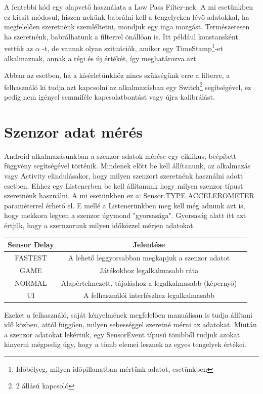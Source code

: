 \documentclass{thesis-ekf}
\theoremstyle{definition}
\theoremstyle{remark}
\begin{document}
\par A fentebbi kód egy alapvető használata a Low Pass Filter-nek. A mi esetünkben ez kicsit módosul, hiszen nekünk babrálni kell a tengelyeken lévő adatokkal, ha megfelelően szeretnénk szemléltetni, mondjuk egy inga mozgást. Természetesen ha szeretnénk, babrálhatunk a filterrel önállóan is. Itt például konstansként vettük az $\alpha$ -t, de vannak olyan szituációk, amikor egy TimeStamp\footnote{Időbélyeg, milyen időpillanatban mértünk adatot, esetünkben}-et alkalmaznak, annak a régi és új értékét, így meghatározva azt.
\par Abban az esetben, ha a kísérletünkhöz nincs szükségünk erre a filterre, a felhasználó ki tudja azt kapcsolni az alkalmazásban egy Switch\footnote{2 állású kapcsoló} segítségével, ez pedig nem igényel semmiféle kapcsolatbontást vagy újra kalibrálást.
\section{Szenzor adat mérés}
Android alkalmazásunkban a szenzor adatok mérése egy ciklikus, beépített függvény segítségével történik. Mindenek előtt be kell állítanunk, az alkalmazás vagy Activity elindulásakor, hogy milyen szenzort szeretnénk használni adott esetben. Ehhez egy Listenerben be kell állítanunk hogy milyen szenzor típust szeretnénk használni. A mi esetünkben ez a: Sensor.TYPE ACCELEROMETER paraméterrel érhető el. E mellé a Listenerünkben meg kell még adnunk azt is, hogy mekkora legyen a szenzor úgymond "gyorsasága". Gyorsaság alatt itt azt értjük, hogy a szernzorunk milyen időközzel mérjen adatokat.
\begin{center}
	\begin{tabular}{ |c|c|c| } 
		\hline
		Sensor Delay & Jelentése\\
		\hline\hline
		FASTEST & A lehető leggyorsabban megkapjuk a szenzor adatot  \\
		\hline
		GAME & Játékokhoz legalkalmasabb ráta\\
		\hline
		NORMAL & Alapértelmezett, tájoláshoz a legalkalmasabb (képernyő) \\
		\hline
		UI & A felhasználói interfészhez legalkalmasabb \\
		\hline
	\end{tabular}
\end{center}
\par Ezeket a felhasználó, saját kényelmének megfelelően manuálisan is tudja állítani idő közben, attól függően, milyen sebességgel szeretné mérni az adatokat. Miután a szenzor adatokat lekértük, egy SensorEvent típusú tömbből tudjuk azokat kinyerni mégpedig úgy, hogy a tömb elemei lesznek az egyes tengelyek értékei.
\end{document}
